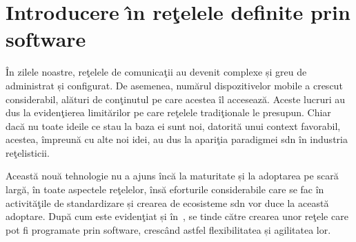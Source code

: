 \chapter{Introducere \^{\i}n reţelele definite prin software\label{ch:introducere_sdn}}

\graphicspath{ {cap-introducere_in_sdn/figures/} }

În zilele noastre, reţelele de comunicaţii au devenit complexe și greu de administrat și configurat. De asemenea, numărul dispozitivelor mobile a crescut considerabil, alături de conţinutul pe care acestea îl accesează. Aceste lucruri au dus la evidenţierea limitărilor pe care reţelele tradiţionale le presupun. Chiar dacă nu toate ideile ce stau la baza ei sunt noi, datorită unui context favorabil, acestea, împreună cu alte noi idei, au dus la apariţia paradigmei \gls{sdn} în industria reţelisticii.

Această nouă tehnologie nu a ajuns încă la maturitate și la adoptarea pe scară largă, în toate aspectele reţelelor, însă eforturile considerabile care se fac în activităţile de standardizare și crearea de ecosisteme \gls{sdn} vor duce la această adoptare. După cum este evidenţiat și în~\cite{nadeau2013sdn}, se tinde către crearea unor reţele care pot fi programate prin software, crescând astfel flexibilitatea și agilitatea lor.




